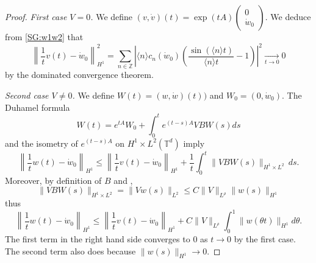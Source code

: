 \documentclass[a4paper]{article}
\theoremstyle{plain}
\newcommand{\T}{\mathbb{T}}
\begin{document}
\begin{proof}
\emph{First case $V=0$.} We define $(v,\dot{v})(t)=\exp(t A) \begin{pmatrix}
0 \\ \dot{w}_0
\end{pmatrix}$.
We deduce from \eqref{SG:w1w2} that
$$ \left\| \frac{1}{t} v(t) - \dot{w}_0 \right\|_{H^1}^2
= \sum_{n \in \mathbb{Z}} \left| 
\langle n \rangle c_n(\dot{w}_0) \left( 
\frac{\sin(\langle n \rangle t)}{\langle n \rangle t} -1 \right)
\right|^2
\underset{t \to 0}{\longrightarrow} 0$$
by the dominated convergence theorem.

\medskip

\noindent \emph{Second case $V \neq 0$.} 
We define $W(t)=(w,\dot{w})(t))$ and $W_0=(0,\dot{w}_0)$.
The Duhamel formula 
$$W(t)=e^{tA}W_0+\int_0^t e^{(t-s)A} VBW(s) ds$$
and the isometry of $e^{(t-s)A}$ on $H^1 \times L^2(\T^d)$ imply
$$\left\| \frac{1}{t}w(t)-\dot{w}_0 \right\|_{H^1} 
\leq \left\| \frac{1}{t} v(t) - \dot{w}_0 \right\|_{H^1}
+ \frac{1}{t} \int_0^t \| V B W(s) \|_{H^1 \times L^2}\, ds.$$
Moreover, by definition of $B$ and ,
$$\| V B W(s) \|_{H^1 \times L^2}
= \|V w(s) \|_{L^2} \leq C \|V\|_{L^{\rho}} \|w(s)\|_{H^1}$$
thus
$$\left\| \frac{1}{t}w(t)-\dot{w}_0 \right\|_{H^1} 
\leq \left\| \frac{1}{t} v(t) - \dot{w}_0 \right\|_{H^1}
+ C \|V\|_{L^{\rho}} \int_0^1 \|w(\theta t)\|_{H^1} d\theta.$$
The first term in the right hand side converges to $0$ as $t \to 0$ by the first case. The second term also does because $\|w(s)\|_{H^1} \to 0$.
\end{proof}
\end{document}

